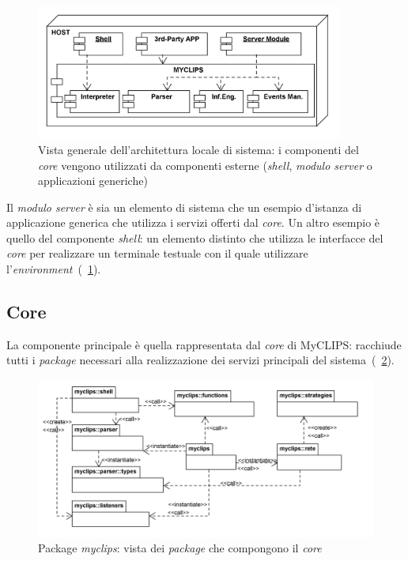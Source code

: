 \begin{figure}[h]
\centering
\includegraphics[width=0.9\textwidth]{Immagini/Capitolo3/Deployment/Shell-3rdPartyApp.png}
\caption[Vista generale dell'architettura locale di sistema]{Vista generale dell'architettura locale di sistema: i componenti del \emph{core} vengono utilizzati da componenti esterne (\emph{shell}, \emph{modulo server} o applicazioni generiche)}\label{fig:architettura-3rdparty}
\end{figure}

Il \emph{modulo server} è sia un elemento di sistema che un esempio d'istanza di applicazione generica che utilizza i servizi offerti dal \emph{core}. Un altro esempio è quello del componente \emph{shell}: un elemento distinto che utilizza le interfacce del \emph{core} per realizzare un terminale testuale con il quale utilizzare l'\emph{environment}~(\figurename~\ref{fig:architettura-3rdparty}).


\subsection{Core}

La componente principale è quella rappresentata dal \emph{core} di MyCLIPS: racchiude tutti i \emph{package} necessari alla realizzazione dei servizi principali del sistema~(\figurename~\ref{fig:packages-myclips}).

\begin{figure}[h]
\centering
\includegraphics[width=1\textwidth]{Immagini/Capitolo3/Packages/Core.png}
\caption{Package \emph{myclips}: vista dei \emph{package} che compongono il \emph{core}}\label{fig:packages-myclips}
\end{figure}

